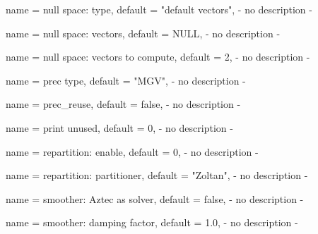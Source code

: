 \begin{parameter}{
    name    = {null space: type},
    default = {"default vectors"},
}
- no description -
\end{parameter}

\begin{parameter}{
    name    = {null space: vectors},
    default = {NULL},
}
- no description -
\end{parameter}

\begin{parameter}{
    name    = {null space: vectors to compute},
    default = {2},
}
- no description -
\end{parameter}

\begin{parameter}{
    name    = {prec type},
    default = {"MGV"},
}
- no description -
\end{parameter}

\begin{parameter}{
    name    = {prec_reuse},
    default = {false},
}
- no description -
\end{parameter}

\begin{parameter}{
    name    = {print unused},
    default = {0},
}
- no description -
\end{parameter}

\begin{parameter}{
    name    = {repartition: enable},
    default = {0},
}
- no description -
\end{parameter}

\begin{parameter}{
    name    = {repartition: partitioner},
    default = {"Zoltan"},
}
- no description -
\end{parameter}

\begin{parameter}{
    name    = {smoother: Aztec as solver},
    default = {false},
}
- no description -
\end{parameter}

\begin{parameter}{
    name    = {smoother: damping factor},
    default = {1.0},
}
- no description -
\end{parameter}

